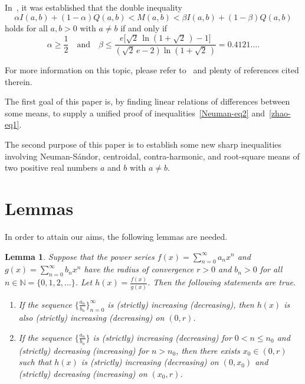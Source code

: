 \documentclass[reqno,a4paper]{amsart}
\numberwithin{equation}{section}
\theoremstyle{plain}
\newtheorem{lem}{Lemma}[section]
\theoremstyle{remark}
\begin{document}
\par
In~\cite[Theorem~3.1]{Z-C-identric}, it was established that the double inequality
\begin{equation*}
\alpha I(a,b)+(1-\alpha)Q(a,b)<M(a,b)<\beta I(a,b)+(1-\beta)Q(a,b)
\end{equation*}
holds for all $a,b>0$ with $a\ne b$ if and only if
\begin{equation*}
\alpha\ge\frac12\quad \text{and} \quad
\beta\le\frac{e\bigl[\sqrt2\,\ln(1+\sqrt2\,)-1\bigr]}
{(\sqrt2\,e-2)\ln(1+\sqrt2\,)}=0.4121\dotsc.
\end{equation*}
\par
For more information on this topic, please refer to~\cite{chu-AAA, C-L-G-S-logarithmic, C-W-refinements, J-Q-contra, Jiang-Neuman, L-L-C-NS, Toader-M-Li-Zheng-Rev.tex, Neuman-note, Neuman-SB-mean, N-J-compan, Neuman-M-Def-2, W-C-L-Sharp, Zhao-note, Z-C-L-optimal, Zhao-geometric} and plenty of references cited therein.
\par
The first goal of this paper is, by finding linear relations of differences between some means, to supply a unified proof of inequalities~\eqref{Neuman-eq2} and~\eqref{zhao-eq1}.
\par
The second purpose of this paper is to establish some new sharp inequalities involving Neuman-S\'andor,
centroidal, contra-harmonic, and root-square means of two positive real numbers $a$ and $b$ with $a\ne b$.

\section{Lemmas}
In order to attain our aims, the following lemmas are needed.

\begin{lem}\cite[Lemma~1.1]{S-M-zero-balanced}\label{lem2.1}
Suppose that the power series $f(x)=\sum_{n=0}^{\infty}a_nx^n$ and $g(x)=\sum_{n=0}^{\infty}b_nx^n$
have the radius of convergence $r>0$ and $b_n>0$ for all $n\in\mathbb{N}=\{0,1,2,\dotsc\}$.
Let $h(x)=\frac{f(x)}{g(x)}$. Then the following statements are true.
\begin{enumerate}
\item
If the sequence $\{\frac{a_n}{b_n}\}_{n=0}^{\infty}$ is \textup{(}strictly\textup{)} increasing
\textup{(}decreasing\textup{)}, then $h(x)$ is also \textup{(}strictly\textup{)}
increasing \textup{(}decreasing\textup{)} on $(0,r)$.
\item
If the sequence $\{\frac{a_n}{b_n}\}$ is \textup{(}strictly\textup{)} increasing \textup{(}decreasing\textup{)}
for $0<n\le n_0$ and \textup{(}strictly\textup{)}
decreasing \textup{(}increasing\textup{)} for $n>n_0$, then there exists $x_0\in(0,r)$ such
that $h(x)$ is \textup{(}strictly\textup{)}
increasing \textup{(}decreasing\textup{)} on $(0,x_0)$ and \textup{(}strictly\textup{)} decreasing
\textup{(}increasing\textup{)} on $(x_0,r)$.
\end{enumerate}
\end{lem}
\end{document}
